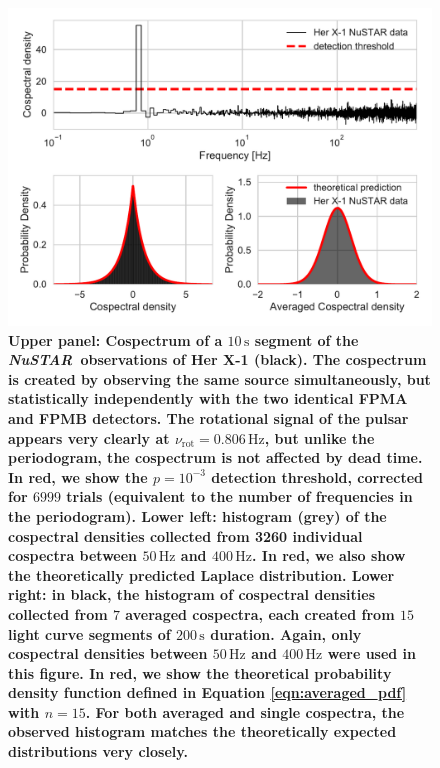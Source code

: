 \documentclass[12pt]{emulateapj}
\newcommand{\project}[1]{\textsl{#1}}
\newcommand{\nustar}{\project{NuSTAR}\xspace}
\begin{document}
\begin{figure}
\begin{center}
\includegraphics[width=\textwidth]{nustar_cospectra.pdf}
\caption{\textbf{Upper panel: Cospectrum of a $10\,\mathrm{s}$ segment of the \nustar\ observations of Her X-1 (black). The cospectrum is created by observing the same source simultaneously, but statistically independently with the two identical FPMA and FPMB detectors. The rotational signal of the pulsar appears very clearly at $\nu_\mathrm{rot} = 0.806\,\mathrm{Hz}$, but unlike the periodogram, the cospectrum is not affected by dead time. In red, we show the $p = 10^{-3}$ detection threshold, corrected for $6999$ trials (equivalent to the number of frequencies in the periodogram). Lower left:  histogram (grey) of the cospectral densities collected from 3260 individual cospectra between $50\,\mathrm{Hz}$ and $400\,\mathrm{Hz}$. In red, we also show the theoretically predicted Laplace distribution. Lower right: in black, the histogram of cospectral densities collected from $7$ averaged cospectra, each created from $15$ light curve segments of $200\,\mathrm{s}$ duration. Again, only cospectral densities between $50\,\mathrm{Hz}$ and $400\,\mathrm{Hz}$ were used in this figure. In red, we show the theoretical probability density function defined in Equation \ref{eqn:averaged_pdf} with $n = 15$. For both averaged and single cospectra, the observed histogram matches the theoretically expected distributions very closely.
}}
\label{fig:herx1_cs}
\end{center}
\end{figure}
\end{document}
